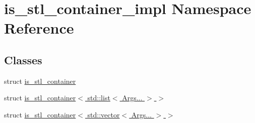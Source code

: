 \hypertarget{namespaceis__stl__container__impl}{}\section{is\+\_\+stl\+\_\+container\+\_\+impl Namespace Reference}
\label{namespaceis__stl__container__impl}
\subsection*{Classes}
\begin{DoxyCompactItemize}
\item 
struct \hyperlink{structis__stl__container__impl_1_1is__stl__container}{is\+\_\+stl\+\_\+container}
\item 
struct \hyperlink{structis__stl__container__impl_1_1is__stl__container_3_01std_1_1list_3_01Args_8_8_8_01_4_01_4}{is\+\_\+stl\+\_\+container$<$ std\+::list$<$ Args... $>$ $>$}
\item 
struct \hyperlink{structis__stl__container__impl_1_1is__stl__container_3_01std_1_1vector_3_01Args_8_8_8_01_4_01_4}{is\+\_\+stl\+\_\+container$<$ std\+::vector$<$ Args... $>$ $>$}
\end{DoxyCompactItemize}
